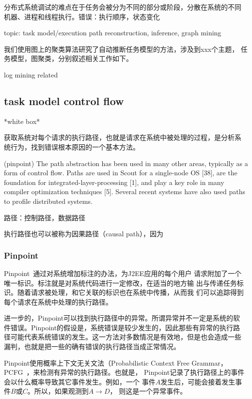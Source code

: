 分布式系统调试的难点在于任务会被分为不同的部分或阶段，分散在系统的不同
机器、进程和线程执行。错误：执行顺序，状态变化

topic: task model/execution path reconstruction, inference, graph
mining

我们使用图上的聚类算法研究了自动推断任务模型的方法，涉及到xxx个主题，
任务模型，图聚类，分别叙述相关工作如下。

log mining related

\subsection{task model control flow}

*white box*

获取系统对每个请求的执行路径，也就是请求在系统中被处理的过程，是分析系
统行为，找到错误根本原因的一个基本方法。

(pinpoint) The path abstraction has been used in many other areas,
typically as a form of control flow. Paths are used in Scout for a
single-node OS [38], are the foundation for
integrated-layer-processing [1], and play a key role in many compiler
optimization techniques [5]. Several recent systems have also used
paths to profile distributed systems.

路径：控制路径，数据路径


执行路径也可以被称为因果路径（causal path），因为


\subsubsection*{Pinpoint}


Pinpoint~\cite{pinpoint}通过对系统增加标注的办法，为J2EE应用的每个用户
请求附加了一个唯一标识。标注就是对系统代码进行一定修改，在适当的地方输
出与传递任务标识。随着请求被处理，和它关联的标识也在系统中传播，从而我
们可以追踪得到每个请求在系统中处理的执行路径。

进一步的，Pinpoint可以找到执行路径中的异常。所谓异常并不一定是系统的软
件错误。Pinpoint的假设是，系统错误是较少发生的，因此那些有异常的执行路
径可能代表系统错误的发生。这一方法对多数情况是有效地，但是也会造成一些
漏判，也就是把一些的确有错误的执行路径当成正常情况。

Pinpoint使用概率上下文无关文法（Probabilistic Context Free
Grammar，PCFG~\cite{Manning1999}，来检测有异常的执行路径。也就是，
Pinpoint记录了执行路径上的事件会以什么概率导致其它事件发生。例如，一个
事件$A$发生后，可能会接着发生事件$B$或$C$。所以，如果观测到$A \to D$，
则这是一个异常事件。

